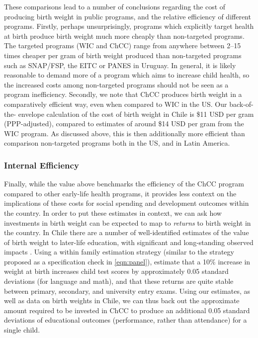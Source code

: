 \documentclass[12pt]{article}
\begin{document}
\begin{spacing}{1.4}
These comparisons lead to a number of conclusions regarding the cost of
producing birth weight in public programs, and the relative efficiency
of different programs.  Firstly, perhaps unsurprisingly, programs which
explicitly target health at birth produce birth weight much more cheaply
than non-targeted programs.  The targeted programs (WIC and ChCC) range
from anywhere between 2--15 times cheaper per gram of birth weight
produced than non-targeted programs such as SNAP/FSP, the EITC or PANES
in Uruguay.  In general, it is likely reasonable to demand more of a
program which aims to increase child health, so the increased costs
among non-targeted programs should not be seen as a program inefficiency.
Secondly, we note that ChCC produces birth weight in a comparatively
efficient way, even when compared to WIC in the US. Our back-of-the-%
envelope calculation of the cost of birth weight in Chile is
\$11 USD per gram (PPP-adjusted), compared to estimates of
around \$14 USD per gram from the WIC program.  As discussed above,
this is then additionally more efficient than comparison non-targeted
programs both in the US, and in Latin America.

\subsubsection{Internal Efficiency}
Finally, while the value above benchmarks the efficiency of the ChCC program
compared to other early-life health programs, it provides less context on
the implications of these costs for social spending and development
outcomes within the country. In order to put these estimates in context,
we can ask how investments in birth weight can be expected to map to
\emph{returns} to birth weight in the country.  In Chile there are a number
of well-identified estimates of the value of birth weight to later-life
education, with significant and long-standing observed impacts
\citep{Bharadwajetal2013,Bharadwajetal2017}.  Using a within family estimation
strategy (similar to the strategy proposed as a specification check in
\ref{eqn:panel}), \citet{Bharadwajetal2017} estimate that a 10\% increase
in weight at birth increases child test scores by approximately 0.05
standard deviations (for language and math), and that these returns are
quite stable between primary, secondary, and university entry exams. Using
our estimates, as well as data on birth weights in Chile, we can thus back out
the approximate amount required to be invested in ChCC to produce an additional
0.05 standard deviations of educational outcomes (performance, rather than
attendance) for a single child.


\end{spacing}
\end{document}
